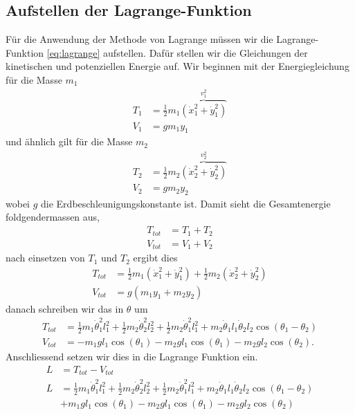 \subsection{Aufstellen der Lagrange-Funktion}
Für die Anwendung der Methode von Lagrange müssen wir die Lagrange-Funktion 
\eqref{eq:lagrange} aufstellen.
Dafür stellen wir die Gleichungen der kinetischen und potenziellen Energie auf.
Wir beginnen mit der Energiegleichung für die Masse \(m_1\)
\begin{align}
    T_1 &= \frac{1}{2} m_1 
    \overbrace{( \dot{x}_1^2 + \dot{y}_1^2 )}^{v_1^2}\\
    V_1 &= g m_1 y_1
\end{align}
und ähnlich gilt für die Masse \(m_2\)
\begin{align}
    T_2 &= \frac{1}{2} m_2 
    \overbrace{( \dot{x}_2^2 + \dot{y}_2^2 )}^{v_2^2} \\
    V_2 &= g m_2 y_2
\end{align}
wobei \(g\) die Erdbeschleunigungskonstante ist.
Damit sieht die Gesamtenergie foldgendermassen aus,
\begin{align}
    T_{tot} &= T_1 + T_2 \\
    V_{tot} &= V_1 + V_2
\end{align}
nach einsetzen von \(T_1\) und \(T_2\) ergibt dies
\begin{align}
    T_{tot} &= \frac{1}{2} m_1 ( \dot{x}_1^2 + \dot{y}_1^2 ) +
    \frac{1}{2} m_2 ( \dot{x}_2^2 + \dot{y}_2^2 ) \\
    V_{tot} &= g ( m_1 y_1 + m_2 y_2 )
\end{align}
danach schreiben wir das in \(\theta\) um
\begin{align}
    T_{tot} &= \frac{1}{2} m_1 \dot{\theta}^2_1 l_1^2 + 
    \frac{1}{2} m_2 \dot{\theta}^2_2 l_2^2 + \frac{1}{2}
    m_2 \dot{\theta}^2_1 l_1^2 + 
    m_2 \dot{\theta}_1 l_1 \dot{\theta}_2 l_2 
    \cos(\theta_1 - \theta_2) \\
    V_{tot} &= -m_1 g l_1 \cos(\theta_1) -
    m_2 g l_1 \cos(\theta_1) -
    m_2 g l_2 \cos(\theta_2).
\end{align}
Anschliessend setzen wir dies in die Lagrange Funktion ein.
\begin{align}
    L &= T_{tot} - V_{tot} \\
    L &= \frac{1}{2} m_1 \dot{\theta}^2_1 l_1^2 + 
    \frac{1}{2} m_2 \dot{\theta}^2_2 l_2^2 + \frac{1}{2}
    m_2 \dot{\theta}^2_1 l_1^2 + 
    m_2 \dot{\theta}_1 l_1 \dot{\theta}_2 l_2 
    \cos(\theta_1 - \theta_2) \\ \nonumber
    &+ m_1 g l_1 \cos(\theta_1) -
    m_2 g l_1 \cos(\theta_1) -
    m_2 g l_2 \cos(\theta_2)
\end{align}

